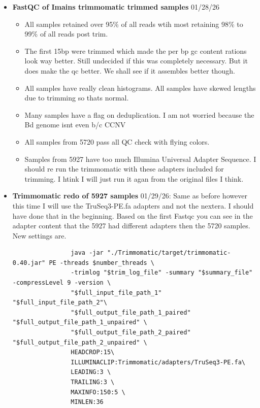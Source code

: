\documentclass{article}
\begin{document}
\begin{itemize}
            \item \textbf{FastQC of Imains trimmomatic trimmed samples} 01/28/26
            \begin{itemize}
                \item All samples retained over 95\% of all reads wtih most retaining 98\% to 99\% of all reads post trim.
                \item The first 15bp were trimmed which made the per bp gc content rations look way better.   Still undecided if this was completely necessary.  But it does make the qc better.  We shall see if it assembles better though.
                \item All samples have really clean histograms.   All samples have skewed lengths due to trimming so thats normal.
                \item Many samples have a flag on deduplication.  I am not worried because the Bd genome isnt even b/c CCNV
                \item All samples from 5720 pass all QC check with flying colors.
                \item Samples from 5927 have too much Illumina Universal Adapter Sequence.   I should re run the trimmomatic with these adapters included for trimming.   I htink I will just run it agan from the original files I think.
            \end{itemize}

            \item \textbf{Trimmomatic redo of 5927 samples} 01/29/26:  Same as before however this time I will use the TruSeq3-PE.fa adapters and not the nextera.   I should have done that in the beginning.   Based on the first Fastqc you can see in the adapter content that the 5927 had different adapters  then the 5720 samples.  New settings are.
            \begin{verbatim}
                java -jar "./Trimmomatic/target/trimmomatic-0.40.jar" PE -threads $number_threads \
                -trimlog "$trim_log_file" -summary "$summary_file" -compressLevel 9 -version \
                "$full_input_file_path_1" "$full_input_file_path_2"\
                "$full_output_file_path_1_paired" "$full_output_file_path_1_unpaired" \
                "$full_output_file_path_2_paired" "$full_output_file_path_2_unpaired" \
                HEADCROP:15\
                ILLUMINACLIP:Trimmomatic/adapters/TruSeq3-PE.fa\
                LEADING:3 \
                TRAILING:3 \
                MAXINFO:150:5 \
                MINLEN:36
            

\end{verbatim}
\end{itemize}
\end{document}
